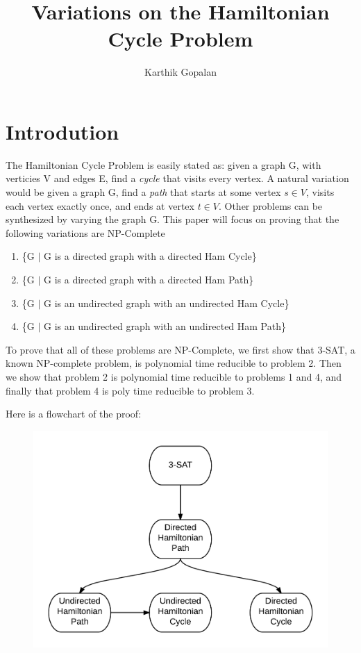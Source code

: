 \documentclass[11pt]{article}
\begin{document}
\title{Variations on the Hamiltonian Cycle Problem}
\author{Karthik Gopalan}
\maketitle

\vfill

\section{Introdution}
The Hamiltonian Cycle Problem is easily stated as: given a graph G, 
with verticies V and edges E, find a \emph{cycle} that visits every vertex. 
A natural variation would be given a graph G, find a \emph{path} that starts at some 
vertex $s \in V$, visits each vertex exactly once, and ends at vertex $t \in V$. Other problems can be synthesized
by varying the graph G. This paper will focus on proving that the following variations are NP-Complete

\begin{enumerate}
\item \{G $|$ G is a directed graph with a directed Ham Cycle\}
\item \{G $|$ G is a directed graph with a directed Ham Path\}
\item \{G $|$ G is an undirected graph with an undirected Ham Cycle\}
\item \{G $|$ G is an undirected graph with an undirected Ham Path\}
\end{enumerate}

To prove that all of these problems are NP-Complete, we first show that 3-SAT, a known
NP-complete problem, is polynomial time reducible to problem 2. Then we show that problem
2 is polynomial time reducible to problems 1 and 4, and finally that problem 4 is poly
time reducible to problem 3.

\newpage
Here is a flowchart of the proof:
\begin{figure}[h]
\centering
\includegraphics[width=.5\textwidth]{ProofOutline.png}
\end{figure}
\end{document}

